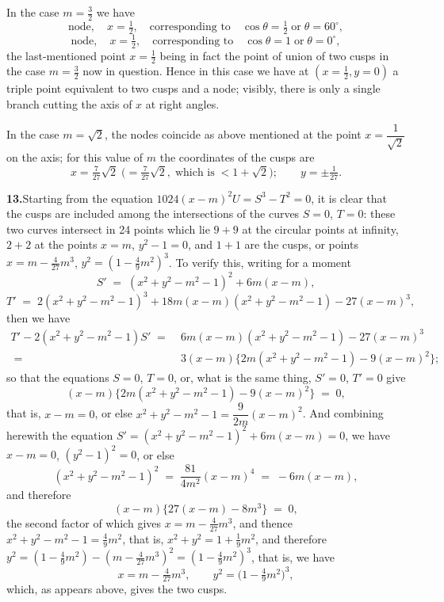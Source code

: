 \documentclass[11pt]{article}
\begin{document}
In the case $m = \tfrac{3}{2}$ we have
\[
\text{node},\quad x = \tfrac{1}{2},\quad \text{corresponding to}\quad \cos\theta = \tfrac{1}{2}\;\text{or}\; \theta = 60^{\circ},
\]
\[
\text{node},\quad x = \tfrac{1}{2},\quad \text{corresponding to}\quad \cos\theta = 1\;\text{or}\; \theta = 0^{\circ},
\]
the last-mentioned point $x = \tfrac{1}{2}$ being in fact the point of union of two cusps in the case $m = \tfrac{3}{2}$ now in question. Hence in this case we have at $(x = \tfrac{1}{2}, y = 0)$ a triple point equivalent to two cusps and a node; visibly, there is only a single branch cutting the axis of $x$ at right angles.

In the case $m = \sqrt{2}$, the nodes coincide as above mentioned at the point $x = \dfrac{1}{\sqrt{2}}$ on the axis; for this value of $m$ the coordinates of the cusps are
\[
x = \tfrac{7}{27}\sqrt{2}\;\bigl(= \tfrac{7}{27}\sqrt{2},\;\text{which is}\; < 1 + \sqrt{2}\bigr);\qquad y = \pm \tfrac{1}{27}.
\]

\textbf{13.}\quad Starting from the equation $1024(x - m)^{2} U = S^{3} - T^{2} = 0$, it is clear that the cusps are included among the intersections of the curves $S = 0$, $T = 0$: these two curves intersect in 24 points which lie $9 + 9$ at the circular points at infinity, $2 + 2$ at the points $x = m$, $y^{2} - 1 = 0$, and $1 + 1$ are the cusps, or points $x = m - \tfrac{4}{27} m^{3}$, $y^{2} = (1 - \tfrac{4}{9} m^{2})^{3}$. To verify this, writing for a moment
\[
S' \;=\; (x^{2} + y^{2} - m^{2} - 1)^{2} + 6 m(x - m),
\]
\[
T' \;=\; 2(x^{2} + y^{2} - m^{2} - 1)^{3} + 18 m(x - m)(x^{2} + y^{2} - m^{2} - 1) - 27(x - m)^{3},
\]
then we have
\begin{align*}
T' - 2(x^{2} + y^{2} - m^{2} - 1) S' \;=\;& 6 m(x - m)(x^{2} + y^{2} - m^{2} - 1) - 27(x - m)^{3}\\
\;=\;& 3(x - m)\bigl\{2 m(x^{2} + y^{2} - m^{2} - 1) - 9(x - m)^{2}\bigr\};
\end{align*}
so that the equations $S = 0$, $T = 0$, or, what is the same thing, $S' = 0$, $T' = 0$ give
\[
(x - m)\bigl\{2 m(x^{2} + y^{2} - m^{2} - 1) - 9(x - m)^{2}\bigr\} \;=\; 0,
\]
that is, $x - m = 0$, or else $x^{2} + y^{2} - m^{2} - 1 = \dfrac{9}{2 m}(x - m)^{2}$. And combining herewith the equation $S' = (x^{2} + y^{2} - m^{2} - 1)^{2} + 6 m(x - m) = 0$, we have $x - m = 0$, $(y^{2} - 1)^{2} = 0$, or else
\[
(x^{2} + y^{2} - m^{2} - 1)^{2} \;=\; \frac{81}{4 m^{2}}(x - m)^{4} \;=\; -6 m(x - m),
\]
and therefore
\[
(x - m)\bigl\{27(x - m) - 8 m^{3}\bigr\} \;=\; 0,
\]
the second factor of which gives $x = m - \tfrac{4}{27} m^{3}$, and thence $x^{2} + y^{2} - m^{2} - 1 = \tfrac{4}{9} m^{2}$, that is, $x^{2} + y^{2} = 1 + \tfrac{1}{9} m^{2}$, and therefore $y^{2} = (1 - \tfrac{4}{9} m^{2}) - (m - \tfrac{4}{27} m^{3})^{2} = (1 - \tfrac{4}{9} m^{2})^{3}$, that is, we have
\[
x = m - \tfrac{4}{27} m^{3},\qquad y^{2} = \bigl(1 - \tfrac{4}{9} m^{2}\bigr)^{3},
\]
which, as appears above, gives the two cusps.
\end{document}
